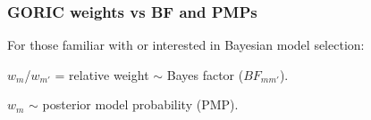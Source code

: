 \documentclass[10pt]{beamer}\usepackage[]{graphicx}\usepackage[]{xcolor}
\begin{document}
%
\begin{frame}
	\frametitle{GORIC weights vs BF and PMPs}
	
	For those familiar with or interested in Bayesian model selection:
	
	\vspace{\baselineskip}
	
		$\mathit{w_{m}}$/$\mathit{w_{m'}}$ = relative weight $\sim$ Bayes factor ($BF_{mm'}$).
		
		\vspace{\baselineskip}
		
		$\mathit{w_{m}}$ $\sim$ posterior model probability (PMP). 
		
		
	
\end{frame}
%
\end{document}
